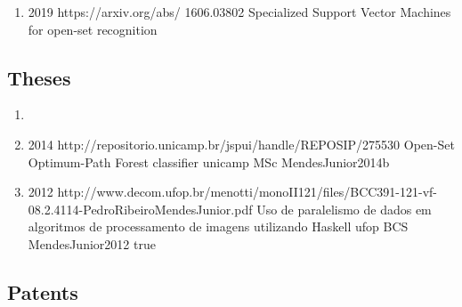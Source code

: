 \begin{enumerate}[resume]
\item{}
  {
  }
  {2019}
  {https://arxiv.org/abs/}
  {1606.03802}
  {Specialized Support Vector Machines for open-set recognition}
  {}
\end{enumerate}

\subsection*{Theses}

\begin{enumerate}[resume]
\item{}
\item{}
  {2014}
  {http://repositorio.unicamp.br/jspui/handle/REPOSIP/275530}
  {Open-Set Optimum-Path Forest classifier}
  {unicamp}
  {MSc}
  {MendesJunior2014b}
  {}
\item{}
  {2012}
  {http://www.decom.ufop.br/menotti/monoII121/files/BCC391-121-vf-08.2.4114-PedroRibeiroMendesJunior.pdf}
  {Uso de paralelismo de dados em algoritmos de processamento de imagens utilizando Haskell}
  {ufop}
  {BCS}
  {MendesJunior2012}
  {true}
\end{enumerate}

\subsection*{Patents}

